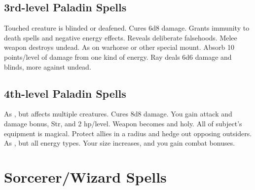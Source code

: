 \subsection{3rd-level Paladin Spells}
\begin{spelllist} 
   Touched creature is blinded or deafened.
   Cures 6d8 damage.
   Grants immunity to death spells and negative energy effects.
   Reveals deliberate falsehoods.
   Melee weapon destroys undead.
   As  on warhorse or other special mount.
   Absorb 10 points/level of damage from one kind of energy.
   Ray deals 6d6 damage and blinds, more against undead.
\end{spelllist}

\subsection{4th-level Paladin Spells}
\begin{spelllist}
   As , but affects multiple creatures.
   Cures 8d8 damage.
   You gain attack and damage bonus,  Str, and 2 hp/level.
   Weapon becomes  and holy.
   All of subject's equipment is magical.
   Protect allies in a \areamed radius and hedge out opposing outsiders.
   As , but all energy types. 
   Your size increases, and you gain combat bonuses.
\end{spelllist}

\section{Sorcerer/Wizard Spells}
